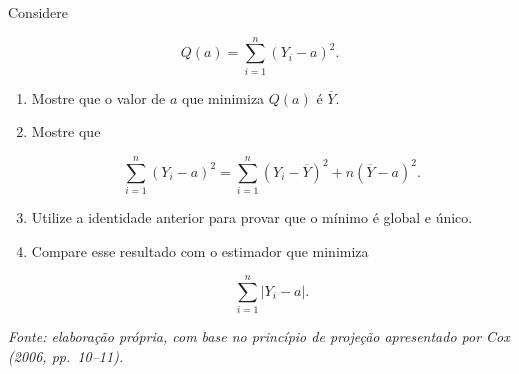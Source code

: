 \documentclass[
  letterpaper,
  DIV=11,
  numbers=noendperiod]{scrreprt}
\begin{document}
\begin{tcolorbox}[enhanced jigsaw, colback=white, leftrule=.75mm, colbacktitle=quarto-callout-tip-color!10!white, breakable, titlerule=0mm, bottomtitle=1mm, title=\textcolor{quarto-callout-tip-color}{\faLightbulb}\hspace{0.5em}{Exercício 3 --- Mínimos quadrados como estimador de localização}, colframe=quarto-callout-tip-color-frame, toprule=.15mm, opacityback=0, bottomrule=.15mm, opacitybacktitle=0.6, arc=.35mm, toptitle=1mm, rightrule=.15mm, coltitle=black, left=2mm]

Considere

\[Q(a)
=
\sum_{i=1}^n
(Y_i-a)^2.\]

\begin{enumerate}
\def\labelenumi{\arabic{enumi}.}
\item
  Mostre que o valor de \(a\) que minimiza \(Q(a)\) é \(\overline Y\).
\item
  Mostre que

  \[\sum_{i=1}^n
  (Y_i-a)^2
  =
  \sum_{i=1}^n
  (Y_i-\overline Y)^2
  +
  n(\overline Y-a)^2.\]
\item
  Utilize a identidade anterior para provar que o mínimo é global e
  único.
\item
  Compare esse resultado com o estimador que minimiza

  \[\sum_{i=1}^n|Y_i-a|.\]
\end{enumerate}

\emph{Fonte: elaboração própria, com base no princípio de projeção
apresentado por Cox (2006, pp.~10--11).}

\end{tcolorbox}
\end{document}
